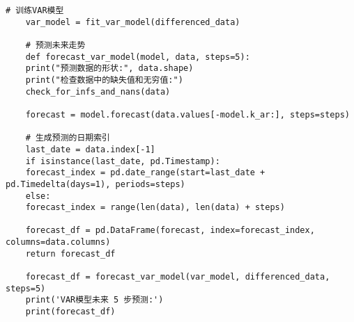 \begin{lstlisting}[caption={问题四处理代码}]
	# 训练VAR模型
	var_model = fit_var_model(differenced_data)
	
	# 预测未来走势
	def forecast_var_model(model, data, steps=5):
	print("预测数据的形状:", data.shape)
	print("检查数据中的缺失值和无穷值:")
	check_for_infs_and_nans(data)
	
	forecast = model.forecast(data.values[-model.k_ar:], steps=steps)
	
	# 生成预测的日期索引
	last_date = data.index[-1]
	if isinstance(last_date, pd.Timestamp):
	forecast_index = pd.date_range(start=last_date + pd.Timedelta(days=1), periods=steps)
	else:
	forecast_index = range(len(data), len(data) + steps)
	
	forecast_df = pd.DataFrame(forecast, index=forecast_index, columns=data.columns)
	return forecast_df
	
	forecast_df = forecast_var_model(var_model, differenced_data, steps=5)
	print('VAR模型未来 5 步预测:')
	print(forecast_df)
	
\end{lstlisting}